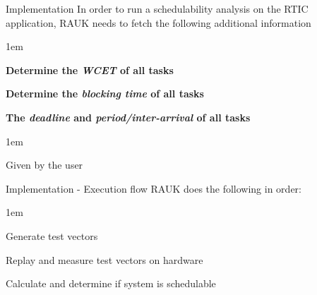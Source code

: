 \begin{frame}{Implementation}
    In order to run a schedulability analysis on the RTIC application,
    RAUK needs to fetch the following additional information
    \vspace{1em}
    \begin{itemize-size}{1em}
        \item \textbf{Determine the \emph{WCET} of all tasks}
        \item \textbf{Determine the \emph{blocking time} of all tasks}
        \item \textbf{The \emph{deadline} and \emph{period/inter-arrival} of all tasks}
        \vspace{0.5em}
            \begin{itemize-size}{1em}
            \item Given by the user 
        \end{itemize-size}
    \end{itemize-size}     
\end{frame}

\begin{frame}{Implementation - Execution flow}
    RAUK does the following in order:
    \vspace{0.5em}
    \begin{itemize-size}{1em}
        \item Generate test vectors
        \item Replay and measure test vectors on hardware
        \item Calculate and determine if system is schedulable
    \end{itemize-size}
    
\end{frame}

